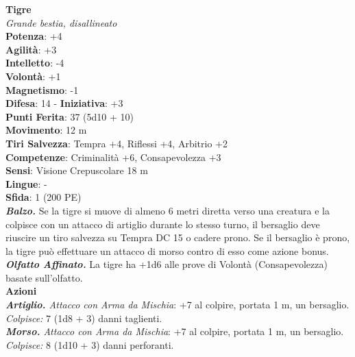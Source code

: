 \begin{multicols}{2}
\medskip\textbf{Tigre}\\
\emph{Grande bestia, disallineato}\\
\textbf{Potenza}: +4\\
\textbf{Agilità}: +3\\
\textbf{Intelletto}: -4\\
\textbf{Volontà}: +1\\
\textbf{Magnetismo}: -1\\
\textbf{Difesa}: 14 - \textbf{Iniziativa}: +3\\
\textbf{Punti Ferita}: 37 (5d10 + 10)\\
\textbf{Movimento}: 12 m\\
\textbf{Tiri Salvezza}: Tempra +4, Riflessi +4, Arbitrio +2\\
\textbf{Competenze}: Criminalità +6, Consapevolezza +3\\
\textbf{Sensi}: Visione Crepuscolare 18 m\\
\textbf{Lingue}: -\\
\textbf{Sfida}: 1 (200 PE)\smallskip\\
\emph{\textbf{Balzo.}} Se la tigre si muove di almeno 6 metri diretta verso una creatura e la colpisce con un attacco di artiglio durante lo stesso turno, il bersaglio deve riuscire un tiro salvezza su Tempra DC  15 o cadere prono. Se il bersaglio è prono, la tigre può effettuare un attacco di morso contro di esso come azione bonus.
\emph{\textbf{Olfatto Affinato.}} La tigre ha +1d6 alle prove di Volontà (Consapevolezza) basate sull'olfatto.\\
\smallskip\textbf{Azioni}\\
\emph{\textbf{Artiglio.} Attacco con Arma da Mischia}: +7 al colpire, portata 1 m, un bersaglio.\\
\emph{Colpisce:} 7 (1d8 + 3) danni taglienti.\\
\emph{\textbf{Morso.} Attacco con Arma da Mischia}: +7 al colpire, portata 1 m, un bersaglio.\\
\emph{Colpisce:} 8 (1d10 + 3) danni perforanti.\\


\end{multicols}
